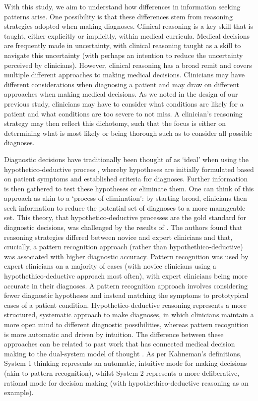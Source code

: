 \documentclass[a4paper, nobind]{templates/ociamthesis}
\begin{document}
\hfill\break
With this study, we aim to understand how differences in information seeking patterns arise. One possibility is that these differences stem from reasoning strategies adopted when making diagnoses. Clinical reasoning is a key skill that is taught, either explicitly or implicitly, within medical curricula. Medical decisions are frequently made in uncertainty, with clinical reasoning taught as a skill to navigate this uncertainty (with perhaps an intention to reduce the uncertainty perceived by clinicians). However, clinical reasoning has a broad remit and covers multiple different approaches to making medical decisions. Clinicians may have different considerations when diagnosing a patient and may draw on different approaches when making medical decisions. As we noted in the design of our previous study, clinicians may have to consider what conditions are likely for a patient and what conditions are too severe to not miss. A clinician's reasoning strategy may then reflect this dichotomy, such that the focus is either on determining what is most likely or being thorough such as to consider all possible diagnoses.

\hfill\break
Diagnostic decisions have traditionally been thought of as `ideal' when using the hypothetico-deductive process \autocite{kuipers_causal_1984}, whereby hypotheses are initially formulated based on patient symptoms and established criteria for diagnoses. Further information is then gathered to test these hypotheses \autocite{higgs_clinical_2019} or eliminate them. One can think of this approach as akin to a `process of elimination': by starting broad, clinicians then seek information to reduce the potential set of diagnoses to a more manageable set. This theory, that hypothetico-deductive processes are the gold standard for diagnostic decisions, was challenged by the results of \textcite{coderre_diagnostic_2003}. The authors found that reasoning strategies differed between novice and expert clinicians and that, crucially, a pattern recognition approach (rather than hypothethico-deductive) was associated with higher diagnostic accuracy. Pattern recognition was used by expert clinicians on a majority of cases (with novice clinicians using a hypothethico-deductive approach most often), with expert clinicians being more accurate in their diagnoses. A pattern recognition approach involves considering fewer diagnostic hypotheses and instead matching the symptoms to prototypical cases of a patient condition. Hypothetico-deductive reasoning represents a more structured, systematic approach to make diagnoses, in which clinicians maintain a more open mind to different diagnostic possibilities, whereas pattern recognition is more automatic and driven by intuition. The difference between these approaches can be related to past work \autocite{norman_etiology_2014} that has connected medical decision making to the dual-system model of thought \autocite{kahneman_thinking_2011}. As per Kahneman's definitions, System 1 thinking represents an automatic, intuitive mode for making decisions (akin to pattern recognition), whilst System 2 represents a more deliberative, rational mode for decision making (with hypothethico-deductive reasoning as an example).
\end{document}
